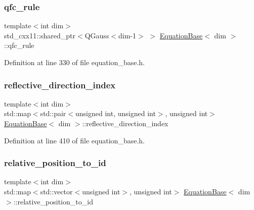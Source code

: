 \subsubsection{\texorpdfstring{qfc\+\_\+rule}{qfc\_rule}}
{\footnotesize\ttfamily template$<$int dim$>$ \\
std\+\_\+cxx11\+::shared\+\_\+ptr$<$Q\+Gauss$<$dim-\/1$>$ $>$ \hyperlink{class_equation_base}{Equation\+Base}$<$ dim $>$\+::qfc\+\_\+rule\hspace{0.3cm}{\ttfamily [protected]}}



Definition at line 330 of file equation\+\_\+base.\+h.

\mbox{\label{class_equation_base_a55a37edb6a0cc2ac25e31b4e8aa91e33}} 
\subsubsection{\texorpdfstring{reflective\+\_\+direction\+\_\+index}{reflective\_direction\_index}}
{\footnotesize\ttfamily template$<$int dim$>$ \\
std\+::map$<$std\+::pair$<$unsigned int, unsigned int$>$, unsigned int$>$ \hyperlink{class_equation_base}{Equation\+Base}$<$ dim $>$\+::reflective\+\_\+direction\+\_\+index\hspace{0.3cm}{\ttfamily [protected]}}



Definition at line 410 of file equation\+\_\+base.\+h.

\mbox{\label{class_equation_base_a53b48062132ee777856a3b340b4000b2}} 
\subsubsection{\texorpdfstring{relative\+\_\+position\+\_\+to\+\_\+id}{relative\_position\_to\_id}}
{\footnotesize\ttfamily template$<$int dim$>$ \\
std\+::map$<$std\+::vector$<$unsigned int$>$, unsigned int$>$ \hyperlink{class_equation_base}{Equation\+Base}$<$ dim $>$\+::relative\+\_\+position\+\_\+to\+\_\+id\hspace{0.3cm}{\ttfamily [protected]}}



